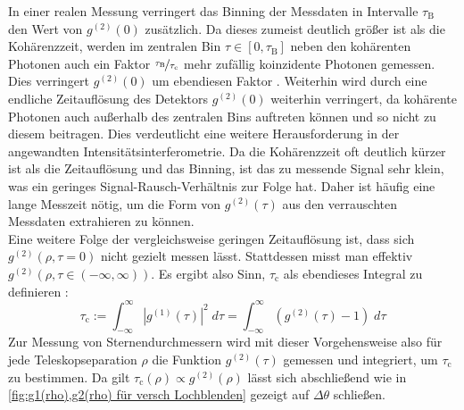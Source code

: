 In einer realen Messung verringert das Binning der Messdaten in Intervalle $\tau_\mathrm{B}$ den Wert von $g^{(2)}(0)$ zusätzlich. 
Da dieses zumeist deutlich größer ist als die Kohärenzzeit, werden im zentralen Bin $\tau \in [0, \tau_\mathrm{B}]$ neben den kohärenten Photonen auch ein Faktor $\nicefrac{\tau_\mathrm{B}}{\tau_{\mathrm{c}}}$ mehr zufällig koinzidente Photonen gemessen. 
Dies verringert $g^{(2)}(0)$ um ebendiesen Faktor \cite[Kap. 14.7]{mandelOpticalCoherenceQuantum1995}. 
Weiterhin wird durch eine endliche Zeitauflösung des Detektors $g^{(2)}(0)$ weiterhin verringert, da kohärente Photonen auch außerhalb des zentralen Bins auftreten können und so nicht zu diesem beitragen. 
Dies verdeutlicht eine weitere Herausforderung in der angewandten Intensitätsinterferometrie. 
Da die Kohärenzzeit oft deutlich kürzer ist als die Zeitauflösung und das Binning, ist das zu messende Signal sehr klein, was ein geringes Signal-Rausch-Verhältnis zur Folge hat. 
Daher ist häufig eine lange Messzeit nötig, um die Form von $g^{(2)}(\tau)$ aus den verrauschten Messdaten extrahieren zu können. \\
Eine weitere Folge der vergleichsweise geringen Zeitauflösung ist, dass sich $g^{(2)}(\rho, \tau=0)$ nicht gezielt messen lässt. 
Stattdessen misst man effektiv $g^{(2)}(\rho, \tau\in(-\infty, \infty))$. 
Es ergibt also Sinn, $\tau_{\mathrm{c}}$ als ebendieses Integral zu definieren \cite[Eq. 14.7-2]{mandelOpticalCoherenceQuantum1995}: 
\begin{equation}
    \tau_{\mathrm{c}} := \int_{-\infty}^{\infty} \left|g^{(1)}(\tau) \right|^2\;d\tau = \int_{-\infty}^{\infty} \left(g^{(2)}(\tau) - 1\right)\;d\tau
\end{equation}
Zur Messung von Sternendurchmessern wird mit dieser Vorgehensweise also für jede Teleskopseparation $\rho$ die Funktion $g^{(2)}(\tau)$ gemessen und integriert, um $\tau_{\mathrm{c}}$ zu bestimmen. 
Da gilt $\tau_{\mathrm{c}}(\rho)\propto g^{(2)}(\rho)$ lässt sich abschließend wie in \autoref{fig:g1(rho),g2(rho) für versch Lochblenden} gezeigt auf $\Delta\theta$ schließen. \\

